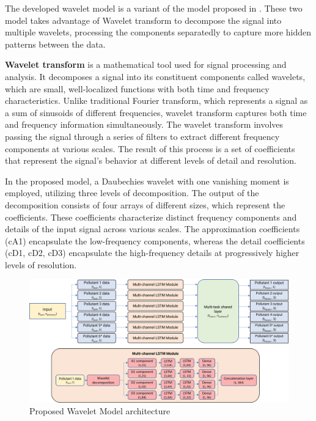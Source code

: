 The developed wavelet model is a variant of the model proposed in \cite{WaveletNLSTM}. These two model takes advantage of Wavelet transform to decompose the signal into multiple wavelets, processing the components separatedly to capture more hidden patterns between the data.

\textbf{Wavelet transform} is a mathematical tool used for signal processing and analysis. It decomposes a signal into its constituent components called wavelets, which are small, well-localized functions with both time and frequency characteristics. Unlike traditional Fourier transform, which represents a signal as a sum of sinusoids of different frequencies, wavelet transform captures both time and frequency information simultaneously.
The wavelet transform involves passing the signal through a series of filters to extract different frequency components at various scales. The result of this process is a set of coefficients that represent the signal's behavior at different levels of detail and resolution.

In the proposed model, a Daubechies wavelet with one vanishing moment is employed, utilizing three levels of decomposition. The output of the decomposition consists of four arrays of different sizes, which represent the coefficients. These coefficients characterize distinct frequency components and details of the input signal across various scales. The approximation coefficients (cA1) encapsulate the low-frequency components, whereas the detail coefficients (cD1, cD2, cD3) encapsulate the high-frequency details at progressively higher levels of resolution. 


\begin{figure}
    \centering
    \includegraphics[width=1\linewidth]{images/model architectures/waveletmodel.png}
    \caption{Proposed Wavelet Model architecture}
    \label{fig:waveletmodel}
\end{figure}

